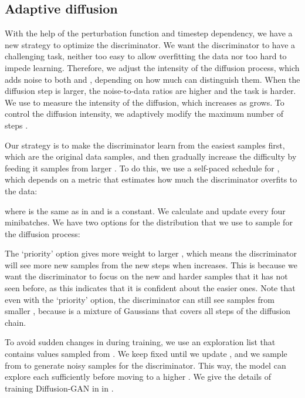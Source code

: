 \documentclass{article} \usepackage{iclr2023_conference,times}
\theoremstyle{plain}
\theoremstyle{definition}
\theoremstyle{remark}
\begin{document}
\subsection{Adaptive diffusion} 

{With the help of the perturbation function and timestep dependency, we have a new strategy to optimize the discriminator.}
We want the discriminator  to have a challenging task, {neither too easy to allow overfitting the data
\citep{karras2020training, zhao2020differentiable} nor too hard to impede learning}. Therefore, we adjust the intensity of the diffusion process, which adds noise to both  and , depending on how much  can distinguish them. When the diffusion step  is larger, the noise-to-data ratios are higher and the task is harder. We use {} to measure the intensity of the diffusion, which increases as  grows. To control the diffusion intensity, we  
adaptively modify the maximum number of steps .


Our strategy is to make the discriminator learn from the easiest samples first, which are the original data samples, and then gradually increase the difficulty by feeding it samples from larger . To do this, we use a self-paced schedule for , which depends on a metric  that estimates how much the discriminator overfits to the data:

where  is the same as in \citet{karras2020training} and  is a constant. We calculate  and update  every four minibatches.
We have two options for the distribution  that we use to sample  for the diffusion process:

The `priority' option gives more weight to larger , which means the discriminator will see more new samples from the new steps when  increases. This is because we want the discriminator to focus on the new and harder samples that it has not seen before, as this indicates that it is confident about the easier ones. Note that even with the `priority' option, the discriminator can still see samples from smaller , because  is a mixture of Gaussians that covers all steps of the diffusion chain.




To avoid sudden changes in  during training, we use an exploration list  that contains  values sampled from . We keep  fixed until we update , and we sample  from  to generate noisy samples for the discriminator. This way, the model can explore each  sufficiently before moving to a higher . We give the details of training Diffusion-GAN in  in .
\end{document}
